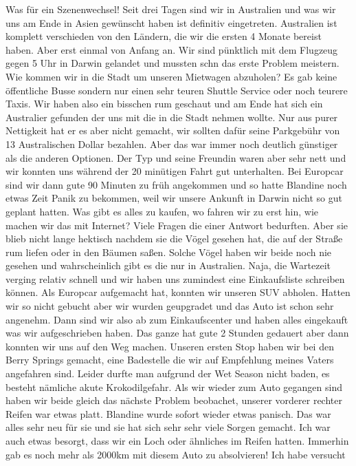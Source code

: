 \documentclass[11pt]{book}
\begin{document}
Was für ein Szenenwechsel! Seit drei Tagen sind wir in Australien und was wir uns am Ende in Asien gewünscht haben ist definitiv 
eingetreten. Australien ist komplett verschieden von den Ländern, die wir die ersten 4 Monate bereist haben. Aber erst einmal von Anfang 
an. Wir sind pünktlich mit dem Flugzeug gegen 5 Uhr in Darwin gelandet und mussten schn das erste Problem meistern. Wie kommen wir 
in die Stadt um unseren Mietwagen abzuholen? Es gab keine öffentliche Busse sondern nur einen sehr teuren Shuttle Service oder noch 
teurere Taxis. Wir haben also ein bisschen rum geschaut und am Ende hat sich ein Australier gefunden der uns mit die in die Stadt 
nehmen wollte. Nur aus purer Nettigkeit hat er es aber nicht gemacht, wir sollten dafür seine Parkgebühr von 13 Australischen Dollar bezahlen.
Aber das war immer noch deutlich günstiger als die anderen Optionen. Der Typ und seine Freundin waren aber sehr nett und wir konnten 
uns während der 20 minütigen Fahrt gut unterhalten. Bei Europcar sind wir dann gute 90 Minuten zu früh angekommen und so hatte 
Blandine noch etwas Zeit Panik zu bekommen, weil wir unsere Ankunft in Darwin nicht so gut geplant hatten. Was gibt es alles zu 
kaufen, wo fahren wir zu erst hin, wie machen wir das mit Internet? Viele Fragen die einer Antwort bedurften. Aber sie blieb nicht 
lange hektisch nachdem sie die Vögel gesehen hat, die auf der Straße rum liefen oder in den Bäumen saßen. Solche Vögel haben wir 
beide noch nie gesehen und wahrscheinlich gibt es die nur in Australien. Naja, die Wartezeit verging relativ schnell und wir haben 
uns zumindest eine Einkaufsliste schreiben können. Als Europcar aufgemacht hat, konnten wir unseren SUV abholen. Hatten wir so nicht 
gebucht aber wir wurden geupgradet und das Auto ist schon sehr angenehm. Dann sind wir also ab zum Einkaufscenter und haben alles 
eingekauft was wir aufgeschrieben haben. Das ganze hat gute 2 Stunden gedauert aber dann konnten wir uns auf den Weg machen. 
Unseren ersten Stop haben wir bei den Berry Springs gemacht, eine Badestelle die wir auf Empfehlung meines Vaters angefahren sind.
Leider durfte man aufgrund der Wet Season nicht baden, es besteht nämliche akute Krokodilgefahr. Als wir wieder zum Auto gegangen sind 
haben wir beide gleich das nächste Problem beobachet, unserer vorderer rechter Reifen war etwas platt. Blandine wurde sofort wieder 
etwas panisch. Das war alles sehr neu für sie und sie hat sich sehr sehr viele Sorgen gemacht. Ich war auch etwas besorgt, dass wir 
ein Loch oder ähnliches im Reifen hatten. Immerhin gab es noch mehr als 2000km mit diesem Auto zu absolvieren! Ich habe versucht 
\end{document}
